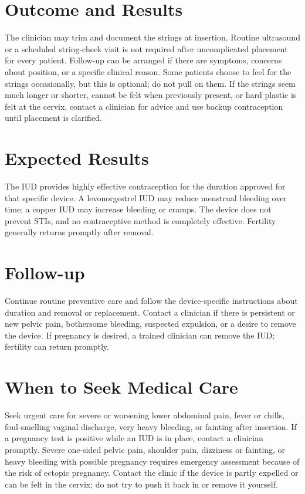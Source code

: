 \section*{Outcome and Results}
The clinician may trim and document the strings at insertion. Routine ultrasound or a scheduled string-check visit is not required after uncomplicated placement for every patient. Follow-up can be arranged if there are symptoms, concerns about position, or a specific clinical reason. Some patients choose to feel for the strings occasionally, but this is optional; do not pull on them. If the strings seem much longer or shorter, cannot be felt when previously present, or hard plastic is felt at the cervix, contact a clinician for advice and use backup contraception until placement is clarified.

\section*{Expected Results}
The IUD provides highly effective contraception for the duration approved for that specific device. A levonorgestrel IUD may reduce menstrual bleeding over time; a copper IUD may increase bleeding or cramps. The device does not prevent STIs, and no contraceptive method is completely effective. Fertility generally returns promptly after removal.

\section*{Follow-up}
Continue routine preventive care and follow the device-specific instructions about duration and removal or replacement. Contact a clinician if there is persistent or new pelvic pain, bothersome bleeding, suspected expulsion, or a desire to remove the device. If pregnancy is desired, a trained clinician can remove the IUD; fertility can return promptly.

\section*{When to Seek Medical Care}
Seek urgent care for severe or worsening lower abdominal pain, fever or chills, foul-smelling vaginal discharge, very heavy bleeding, or fainting after insertion. If a pregnancy test is positive while an IUD is in place, contact a clinician promptly. Severe one-sided pelvic pain, shoulder pain, dizziness or fainting, or heavy bleeding with possible pregnancy requires emergency assessment because of the risk of ectopic pregnancy. Contact the clinic if the device is partly expelled or can be felt in the cervix; do not try to push it back in or remove it yourself.

